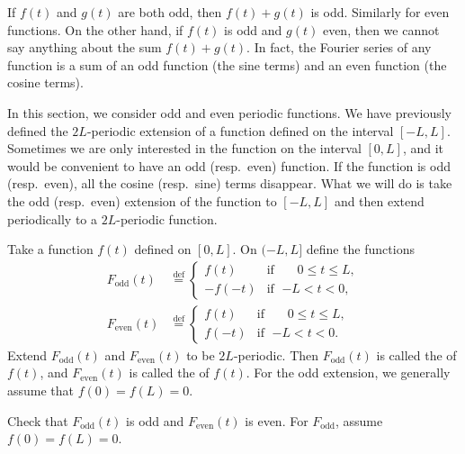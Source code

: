 If $f(t)$ and $g(t)$ are both odd, then $f(t)+g(t)$ is odd.  Similarly for
even functions.  On the other hand,
if $f(t)$ is odd and $g(t)$ even, then we cannot say anything about
the sum
$f(t) + g(t)$.  In fact, the Fourier series of any function is a sum of
an odd function (the sine terms) and an even function (the cosine terms).

In this section, we consider odd and even periodic
functions.  We have previously defined the $2L$-periodic extension
of a function defined on the interval $[-L,L]$.  Sometimes we are only
interested in the function on the interval $[0,L]$, and it would be convenient
to have an odd (resp.\ even) function.  If the function is odd (resp.\ even),
all the cosine (resp.\ sine) terms disappear.
What we will do is
take the
odd (resp.\ even) extension of the function to $[-L,L]$ and then 
extend periodically to a $2L$-periodic function.

Take a function $f(t)$ defined on $[0,L]$.  On $(-L,L]$ define the functions
\begin{align*}
F_{\text{odd}}(t) & \overset{\text{def}}{=}
\begin{cases}
f(t) & \text{if } \; \phantom{-}0 \leq t \leq L , \\
-f(-t) & \text{if } \; {-L} < t < 0 ,
\end{cases}
\\
F_{\text{even}}(t) & \overset{\text{def}}{=}
\begin{cases}
f(t) & \text{if } \; \phantom{-}0 \leq t \leq L , \\
f(-t) & \text{if } \; {-L} < t < 0 .
\end{cases}
\end{align*}
Extend $F_{\text{odd}}(t)$ and $F_{\text{even}}(t)$ to be $2L$-periodic.
Then
$F_{\text{odd}}(t)$ is called
the \emph{} of $f(t)$, and
$F_{\text{even}}(t)$ is called the
\emph{} of $f(t)$.
For the odd extension, we generally assume that $f(0) = f(L) = 0$.

\begin{exercise}
Check that $F_{\text{odd}}(t)$ is odd and $F_{\text{even}}(t)$ is even.
For $F_{\text{odd}}$,
assume $f(0) = f(L) = 0$.
\end{exercise}

